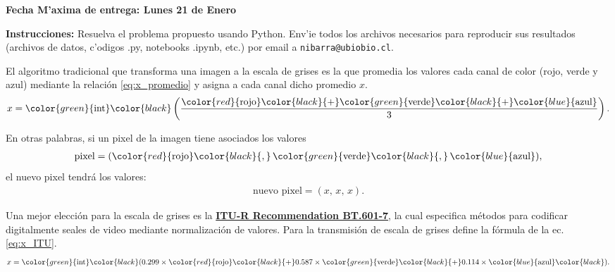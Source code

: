 \documentclass[11pt]{exam}
\begin{document}
\firstpageheadrule
\runningheadrule
{}
\cfoot{ }
\begin{flushleft}
\vspace{0.2in}
\vspace{0.25cm}
\end{flushleft}

\begin{center}
\textbf{Fecha M'axima de entrega: Lunes 21 de Enero}
\end{center}
\textbf{Instrucciones:} Resuelva el problema propuesto usando Python. Env'ie todos los archivos necesarios para reproducir sus resultados (archivos de datos, c'odigos .py, notebooks .ipynb, etc.) por email a \texttt{nibarra@ubiobio.cl}.

\bigskip
El algoritmo tradicional que transforma una imagen a la escala de grises es la que promedia los valores cada canal de color (rojo, verde y azul) mediante la relaci\'on \eqref{eq:x_promedio} y asigna a cada canal dicho promedio $x$.
\def \rojo{\color{red}{\text{rojo}}}
\def \verde{\color{green}{\text{verde}}}
\def \azul{\color{blue}{\text{azul}}}
\def \plus{\color{black}{+}}
\def \coma{\color{black}{,}}
\begin{align}
x = \color{green}{\text{int}} \color{black} 
\left(\frac{ \rojo \plus \verde \plus \azul}{3}\right). \label{eq:x_promedio}
\end{align}

En otras palabras, si un pixel de la imagen tiene asociados los valores
\begin{align}
\text{pixel} = (\rojo \coma\, \verde \coma\, \azul), 
\end{align}
el nuevo pixel tendr\'a los valores:
\begin{align}
\text{nuevo pixel} = (x,\, x,\, x).
\end{align}

Una mejor elecci\'on para la escala de grises es la \href{https://es.wikipedia.org/wiki/UIT-R_BT.601-7}{\textbf{ITU-R Recommendation BT.601-7}}, la cual especifica m\'etodos para codificar digitalmente seales de video mediante normalizaci\'on de valores. Para la transmisi\'on de escala de grises define la f\'ormula de la ec. \eqref{eq:x_ITU}.
\begin{align}
x = \color{green}{\text{int}} \color{black}(0.299 \times \rojo \plus 0.587 \times \verde \plus 0.114 \times \azul \color{black}). \label{eq:x_ITU}
\end{align}
\end{document}
